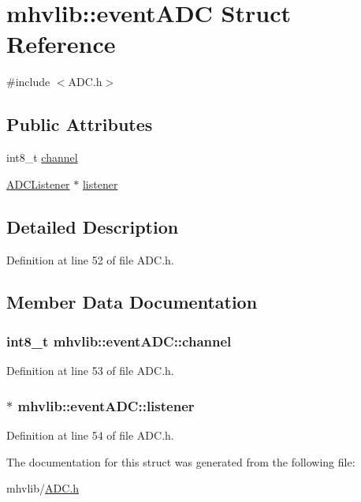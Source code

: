 \hypertarget{structmhvlib_1_1event_a_d_c}{\section{mhvlib\-:\-:event\-A\-D\-C Struct Reference}
\label{structmhvlib_1_1event_a_d_c}
}


{\ttfamily \#include $<$A\-D\-C.\-h$>$}

\subsection*{Public Attributes}
\begin{DoxyCompactItemize}
\item 
int8\-\_\-t \hyperlink{structmhvlib_1_1event_a_d_c_aa7dc7c6e8160aac36f2067840022c0c0}{channel}
\item 
\hyperlink{classmhvlib_1_1_a_d_c_listener}{A\-D\-C\-Listener} $\ast$ \hyperlink{structmhvlib_1_1event_a_d_c_a7b7e077321410cc246f56e11e7ef1b45}{listener}
\end{DoxyCompactItemize}


\subsection{Detailed Description}


Definition at line 52 of file A\-D\-C.\-h.



\subsection{Member Data Documentation}
\hypertarget{structmhvlib_1_1event_a_d_c_aa7dc7c6e8160aac36f2067840022c0c0}{
\subsubsection[{channel}]{\setlength{\rightskip}{0pt plus 5cm}int8\-\_\-t mhvlib\-::event\-A\-D\-C\-::channel}}\label{structmhvlib_1_1event_a_d_c_aa7dc7c6e8160aac36f2067840022c0c0}


Definition at line 53 of file A\-D\-C.\-h.

\hypertarget{structmhvlib_1_1event_a_d_c_a7b7e077321410cc246f56e11e7ef1b45}{
\subsubsection[{listener}]{$\ast$ mhvlib\-::event\-A\-D\-C\-::listener}}\label{structmhvlib_1_1event_a_d_c_a7b7e077321410cc246f56e11e7ef1b45}


Definition at line 54 of file A\-D\-C.\-h.



The documentation for this struct was generated from the following file\-:\begin{DoxyCompactItemize}
\item 
mhvlib/\hyperlink{_a_d_c_8h}{A\-D\-C.\-h}\end{DoxyCompactItemize}
